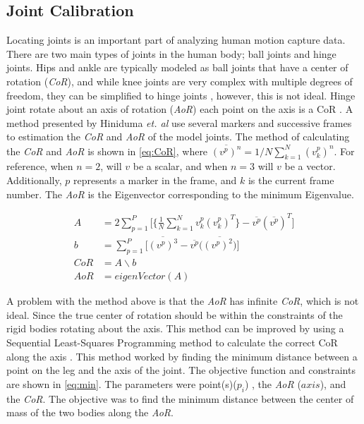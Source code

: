 \subsection{Joint Calibration}
Locating joints is an important part of analyzing human motion capture data. There are two main types of joints in the human body; ball joints and hinge joints. Hips and ankle are typically modeled as ball joints that have a center of rotation (\textit{CoR}), and while knee joints are very complex with multiple degrees of freedom, they can be simplified to hinge joints \cite{hefzy1996review}, however, this is not ideal. Hinge joint rotate about an axis of rotation (\textit{AoR}) each point on the axis is a CoR \cite{halvorsen1999new}. A method presented by Hiniduma \textit{et. al} use several markers and successive frames to estimation the \textit{CoR} and \textit{AoR} of the model joints. The method of calculating the \textit{CoR} and \textit{AoR} is shown in \autoref{eq:CoR}, where $\overline{(v^p)^n} = 1/N \sum_{k=1}^N (v_k^p)^n$. For reference, when $n=2$, will $v$ be a scalar, and when $n=3$  will $v$ be a vector. Additionally, $p$ represents a marker in the frame, and $k$ is the current frame number. The \textit{AoR} is the Eigenvector corresponding to the minimum Eigenvalue.

\begin{equation}
    \begin{aligned}
        A &= 2 \sum^{P}_{p=1} \Bigg[ \bigg\{  \frac{1}{N} \sum^{N}_{k=1} v_k^p (v_k^p)^T \bigg\} -  \overline{v^p}(\overline{v^p})^T \Bigg] \\
        b &= \sum^{P}_{p=1} \Big[ \overline{(v^p)^3} - \overline{v^p} (\overline{(v^p)^2)} \Big] \\
        CoR &= A \backslash b\\
        AoR &=  eigenVector(A)
\end{aligned}
        \label{eq:CoR}
\end{equation}

A problem with the method above is that the \textit{AoR} has infinite \textit{CoR}, which is not ideal. Since the true center of rotation should be within the constraints of the rigid bodies rotating about the axis. This method can be improved by using a Sequential Least-Squares Programming method to calculate the correct CoR along the axis \cite{Least-Squares-Fitting}. This method worked by finding the minimum distance between a point on the leg and the axis of the joint. The objective function and constraints are shown in \autoref{eq:min}. The parameters were point(s)($p_i$) , the \textit{AoR} ($axis$), and the \textit{CoR}. The objective was to find the minimum distance between the center of mass of the two bodies along the \textit{AoR}. 

